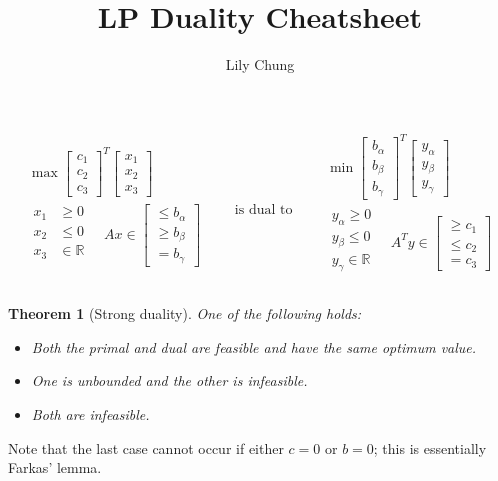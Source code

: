 \documentclass{article}
\title{LP Duality Cheatsheet}
\author{Lily Chung}
\date{}
\newtheorem{theorem}{Theorem}
\newcommand*{\mat}[1]{\begin{bmatrix}#1\end{bmatrix}}
\newcommand*{\R}[0]{\mathbb{R}}
\begin{document}
\maketitle

\begin{tcolorbox}
  \[
  \begin{gathered}
    \max\mat{c_1 \\ c_2 \\ c_3}^T \mat{x_1 \\ x_2 \\ x_3} \\
    \begin{aligned}
      x_1 &\ge 0 \\
      x_2 &\le 0 \\
      x_3 &\in \R \\
    \end{aligned}\quad
    Ax \in \mat{\le b_\alpha \\ \ge b_\beta \\ = b_\gamma} \\
  \end{gathered}
  \qquad\text{is dual to}\qquad
  \begin{gathered}
    \min\mat{b_\alpha \\ b_\beta \\ b_\gamma}^T \mat{y_\alpha \\ y_\beta \\ y_\gamma} \\
    \begin{aligned}
      y_\alpha \ge 0 \\
      y_\beta \le 0 \\
      y_\gamma \in \R \\
    \end{aligned}\quad
    A^Ty \in \mat{\ge c_1 \\ \le c_2 \\ = c_3} \\
  \end{gathered}
  \]
\end{tcolorbox}
\begin{theorem}[Strong duality]
  One of the following holds:
  \begin{itemize}
  \item Both the primal and dual are feasible and have the same optimum value.
  \item One is unbounded and the other is infeasible.
  \item Both are infeasible.
  \end{itemize}
\end{theorem}
Note that the last case cannot occur if either \(c = 0\) or \(b = 0\); this is essentially Farkas' lemma.
\end{document}
